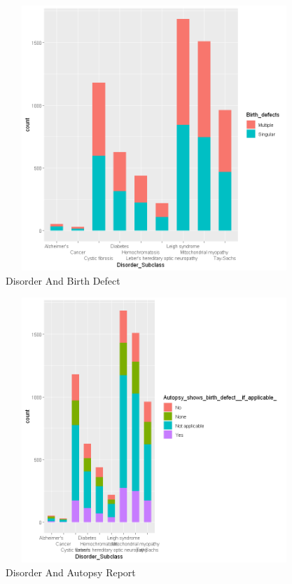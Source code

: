 \begin{figure}[htpb]
	\centering
	\includegraphics[height=10cm, width=12cm]{figures/Birthdefect.png}
	\caption{Disorder And Birth Defect}
	\label{fig 11}
\end{figure}

\begin{figure}[htpb]
	\centering
	\includegraphics[height=10cm, width=12cm]{figures/autopsy.png}
	\caption{Disorder And Autopsy Report}
	\label{fig 12}
\end{figure}

